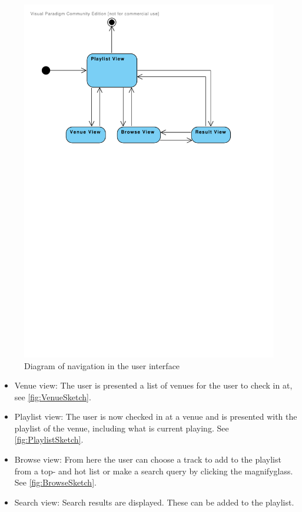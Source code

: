 \begin{figure}[hbtp]
  \centering
  \includegraphics[width=1.0\linewidth]{Images/UserInterface.pdf}
  \caption{Diagram of navigation in the user interface}\label{fig:UserInterface}
\end{figure}

\begin{itemize}
\item Venue view: The user is presented a list of venues for the user to check in at, see \cref{fig:VenueSketch}.
\item Playlist view: The user is now checked in at a venue and is presented with the playlist of the venue, including what is current playing. See \cref{fig:PlaylistSketch}.
\item Browse view: From here the user can choose a track to add to the playlist from a top- and hot list or make a search query by clicking the magnifyglass. See \cref{fig:BrowseSketch}.
\item Search view: Search results are displayed. These can be added to
  the playlist.
\end{itemize}

